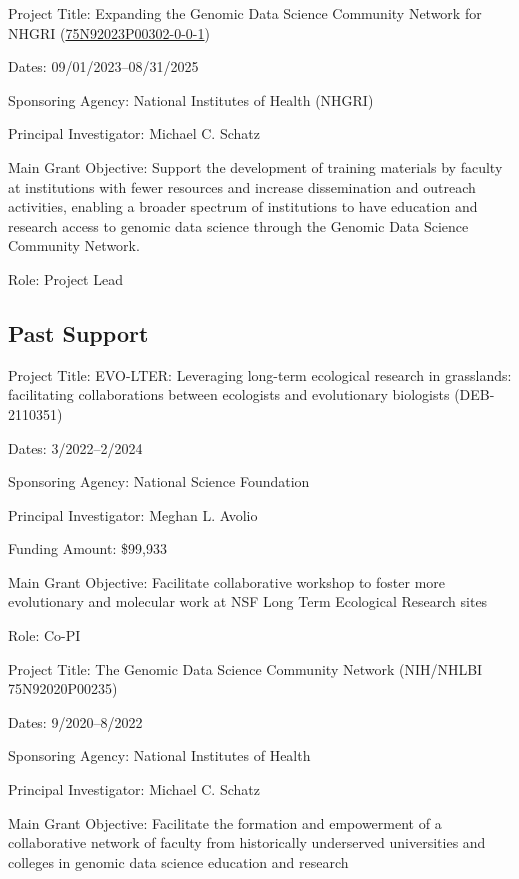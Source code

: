 \documentclass{cv}
\begin{document}
\vspace{5mm}

Project Title: Expanding the Genomic Data Science Community Network for NHGRI (\href{https://reporter.nih.gov/search/hBYvgxL2yUO5iw9lGMoYTA/project-details/10944109}{75N92023P00302-0-0-1})

Dates: 09/01/2023--08/31/2025

Sponsoring Agency: National Institutes of Health (NHGRI)

Principal Investigator: Michael C. Schatz

Main Grant Objective: Support the development of training materials by faculty at institutions with fewer resources and increase dissemination and outreach activities, enabling a broader spectrum of institutions to have education and research access to genomic data science through the Genomic Data Science Community Network.

Role: Project Lead

\subsection*{Past Support}

Project Title: EVO-LTER: Leveraging long-term ecological research in grasslands: facilitating collaborations between ecologists and evolutionary biologists (DEB-2110351)

Dates: 3/2022--2/2024

Sponsoring Agency: National Science Foundation

Principal Investigator: Meghan L. Avolio

Funding Amount: \$99,933

Main Grant Objective: Facilitate collaborative workshop to foster more evolutionary and molecular work at NSF Long Term Ecological Research sites

Role: Co-PI

\vspace{5mm}

Project Title: The Genomic Data Science Community Network (NIH/NHLBI 75N92020P00235)

Dates: 9/2020--8/2022

Sponsoring Agency: National Institutes of Health

Principal Investigator: Michael C. Schatz

Main Grant Objective: Facilitate the formation and empowerment of a collaborative network of faculty from historically underserved universities and colleges in genomic data science education and research
\end{document}
